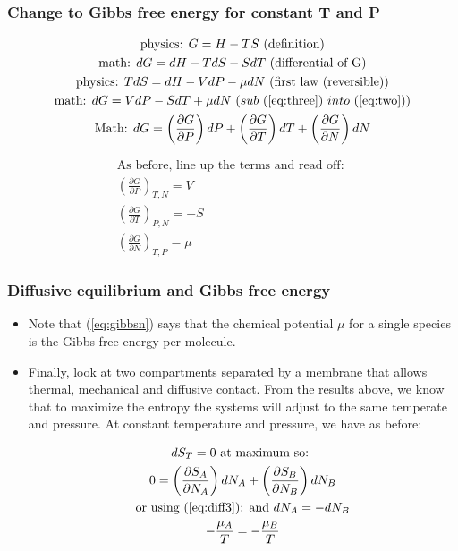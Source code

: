 \documentclass[hyperref={colorlinks=true,linkcolor=blue,urlcolor=blue},numbers]{beamer}
\begin{document}
\begin{frame}
  \frametitle{Change to Gibbs free energy for constant T and P}

  \begin{subequations}
  \begin{gather}
\text{physics: }    G = H - TS\  \text{(definition)}\label{eq:one}\\
\text{math: }     dG = dH - T dS - S dT \text{ (differential of G)} \label{eq:two}\\
\text{physics: } T dS = dH - V dP - \mu dN \text{ (first law (reversible))} \label{eq:three}\\
\text{math: } dG = V dP - S dT + \mu dN\ \text(sub\ (\ref{eq:three})\ into 
\ (\ref{eq:two}))\\
  \text{Math: } dG = \left ( \frac{\partial G }{\partial P} \right ) dP +
\left ( \frac{\partial G }{\partial T} \right ) dT +
\left ( \frac{\partial G }{\partial N} \right ) dN 
  \end{gather}
  \end{subequations}

  \begin{gather}
\text{As before, line up the terms and read off: } \nonumber\\
 \left ( \frac{\partial G }{\partial P}   \right )_{T,N} = V \\
 \left (  \frac{ \partial G}{ \partial T}  \right )_{P,N} = -S\\
 \left (  \frac{ \partial G}{ \partial N}  \right )_{T,P} = \mu \label{eq:gibbsn}
\end{gather}

\end{frame}

\begin{frame}
  \frametitle{Diffusive equilibrium and Gibbs free energy}

  \begin{itemize}
  \item Note that (\ref{eq:gibbsn}) says that the chemical potential $\mu$
for a single species  is the Gibbs free energy per molecule.


\item Finally, look at two compartments separated by a membrane
that allows thermal, mechanical and diffusive contact.  From
the results above, we know that to maximize the entropy the
systems will adjust to the same temperate and pressure.  At constant
temperature and pressure, we have as before:

\begin{gather}
dS_T = \text{0 at maximum so: }\nonumber\\
0 =  \left ( \frac{\partial S_A }{\partial N_A} \right ) dN_A + 
 \left ( \frac{\partial S_B }{\partial N_B} \right ) dN_B\nonumber\\
\text{or using (\ref{eq:diff3}): and $dN_A = -dN_B$}\nonumber\\
-\frac{\mu_A }{T}  = - \frac{\mu_B }{T} \label{eq:mufinal}
\end{gather}
 \end{itemize}

\end{frame}
\end{document}
